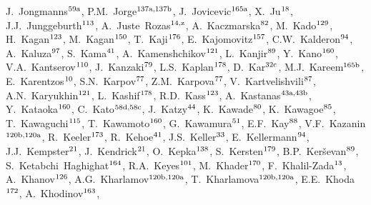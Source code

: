 \begin{flushleft}
J.~Jongmanns$^\textrm{\scriptsize 59a}$,    
P.M.~Jorge$^\textrm{\scriptsize 137a,137b}$,    
J.~Jovicevic$^\textrm{\scriptsize 165a}$,    
X.~Ju$^\textrm{\scriptsize 18}$,    
J.J.~Junggeburth$^\textrm{\scriptsize 113}$,    
A.~Juste~Rozas$^\textrm{\scriptsize 14,z}$,    
A.~Kaczmarska$^\textrm{\scriptsize 82}$,    
M.~Kado$^\textrm{\scriptsize 129}$,    
H.~Kagan$^\textrm{\scriptsize 123}$,    
M.~Kagan$^\textrm{\scriptsize 150}$,    
T.~Kaji$^\textrm{\scriptsize 176}$,    
E.~Kajomovitz$^\textrm{\scriptsize 157}$,    
C.W.~Kalderon$^\textrm{\scriptsize 94}$,    
A.~Kaluza$^\textrm{\scriptsize 97}$,    
S.~Kama$^\textrm{\scriptsize 41}$,    
A.~Kamenshchikov$^\textrm{\scriptsize 121}$,    
L.~Kanjir$^\textrm{\scriptsize 89}$,    
Y.~Kano$^\textrm{\scriptsize 160}$,    
V.A.~Kantserov$^\textrm{\scriptsize 110}$,    
J.~Kanzaki$^\textrm{\scriptsize 79}$,    
L.S.~Kaplan$^\textrm{\scriptsize 178}$,    
D.~Kar$^\textrm{\scriptsize 32c}$,    
M.J.~Kareem$^\textrm{\scriptsize 165b}$,    
E.~Karentzos$^\textrm{\scriptsize 10}$,    
S.N.~Karpov$^\textrm{\scriptsize 77}$,    
Z.M.~Karpova$^\textrm{\scriptsize 77}$,    
V.~Kartvelishvili$^\textrm{\scriptsize 87}$,    
A.N.~Karyukhin$^\textrm{\scriptsize 121}$,    
L.~Kashif$^\textrm{\scriptsize 178}$,    
R.D.~Kass$^\textrm{\scriptsize 123}$,    
A.~Kastanas$^\textrm{\scriptsize 43a,43b}$,    
Y.~Kataoka$^\textrm{\scriptsize 160}$,    
C.~Kato$^\textrm{\scriptsize 58d,58c}$,    
J.~Katzy$^\textrm{\scriptsize 44}$,    
K.~Kawade$^\textrm{\scriptsize 80}$,    
K.~Kawagoe$^\textrm{\scriptsize 85}$,    
T.~Kawaguchi$^\textrm{\scriptsize 115}$,    
T.~Kawamoto$^\textrm{\scriptsize 160}$,    
G.~Kawamura$^\textrm{\scriptsize 51}$,    
E.F.~Kay$^\textrm{\scriptsize 88}$,    
V.F.~Kazanin$^\textrm{\scriptsize 120b,120a}$,    
R.~Keeler$^\textrm{\scriptsize 173}$,    
R.~Kehoe$^\textrm{\scriptsize 41}$,    
J.S.~Keller$^\textrm{\scriptsize 33}$,    
E.~Kellermann$^\textrm{\scriptsize 94}$,    
J.J.~Kempster$^\textrm{\scriptsize 21}$,    
J.~Kendrick$^\textrm{\scriptsize 21}$,    
O.~Kepka$^\textrm{\scriptsize 138}$,    
S.~Kersten$^\textrm{\scriptsize 179}$,    
B.P.~Ker\v{s}evan$^\textrm{\scriptsize 89}$,    
S.~Ketabchi~Haghighat$^\textrm{\scriptsize 164}$,    
R.A.~Keyes$^\textrm{\scriptsize 101}$,    
M.~Khader$^\textrm{\scriptsize 170}$,    
F.~Khalil-Zada$^\textrm{\scriptsize 13}$,    
A.~Khanov$^\textrm{\scriptsize 126}$,    
A.G.~Kharlamov$^\textrm{\scriptsize 120b,120a}$,    
T.~Kharlamova$^\textrm{\scriptsize 120b,120a}$,    
E.E.~Khoda$^\textrm{\scriptsize 172}$,    
A.~Khodinov$^\textrm{\scriptsize 163}$,    

\end{flushleft}
